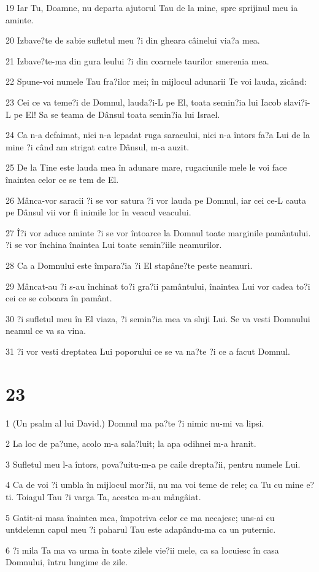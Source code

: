 \par 19 Iar Tu, Doamne, nu departa ajutorul Tau de la mine, spre sprijinul meu ia aminte.
\par 20 Izbave?te de sabie sufletul meu ?i din gheara câinelui via?a mea.
\par 21 Izbave?te-ma din gura leului ?i din coarnele taurilor smerenia mea.
\par 22 Spune-voi numele Tau fra?ilor mei; în mijlocul adunarii Te voi lauda, zicând:
\par 23 Cei ce va teme?i de Domnul, lauda?i-L pe El, toata semin?ia lui Iacob slavi?i-L pe El! Sa se teama de Dânsul toata semin?ia lui Israel.
\par 24 Ca n-a defaimat, nici n-a lepadat ruga saracului, nici n-a întors fa?a Lui de la mine ?i când am strigat catre Dânsul, m-a auzit.
\par 25 De la Tine este lauda mea în adunare mare, rugaciunile mele le voi face înaintea celor ce se tem de El.
\par 26 Mânca-vor saracii ?i se vor satura ?i vor lauda pe Domnul, iar cei ce-L cauta pe Dânsul vii vor fi inimile lor în veacul veacului.
\par 27 Î?i vor aduce aminte ?i se vor întoarce la Domnul toate marginile pamântului. ?i se vor închina înaintea Lui toate semin?iile neamurilor.
\par 28 Ca a Domnului este împara?ia ?i El stapâne?te peste neamuri.
\par 29 Mâncat-au ?i s-au închinat to?i gra?ii pamântului, înaintea Lui vor cadea to?i cei ce se coboara în pamânt.
\par 30 ?i sufletul meu în El viaza, ?i semin?ia mea va sluji Lui. Se va vesti Domnului neamul ce va sa vina.
\par 31 ?i vor vesti dreptatea Lui poporului ce se va na?te ?i ce a facut Domnul.

\chapter{23}

\par 1 (Un psalm al lui David.) Domnul ma pa?te ?i nimic nu-mi va lipsi.
\par 2 La loc de pa?une, acolo m-a sala?luit; la apa odihnei m-a hranit.
\par 3 Sufletul meu l-a întors, pova?uitu-m-a pe caile drepta?ii, pentru numele Lui.
\par 4 Ca de voi ?i umbla în mijlocul mor?ii, nu ma voi teme de rele; ca Tu cu mine e?ti. Toiagul Tau ?i varga Ta, acestea m-au mângâiat.
\par 5 Gatit-ai masa înaintea mea, împotriva celor ce ma necajesc; uns-ai cu untdelemn capul meu ?i paharul Tau este adapându-ma ca un puternic.
\par 6 ?i mila Ta ma va urma în toate zilele vie?ii mele, ca sa locuiesc în casa Domnului, întru lungime de zile.


